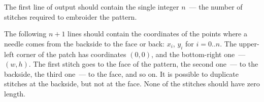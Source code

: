 The first line of output should contain the single integer $n$~--- the number of stitches required to embroider the pattern. 

The following $n + 1$ lines should contain the coordinates of the points where a needle comes from the backside to the face or back: $x_i$, $y_i$ for $i=0..n$. The upper-left corner of the patch has coordinates $(0, 0)$, and the bottom-right one~--- $(w, h)$. The first stitch goes to the face of the pattern, the second one~--- to the backside, the third one~--- to the face, and so on. It is possible to duplicate stitches at the backside, but not at the face. None of the stitches should have zero length.